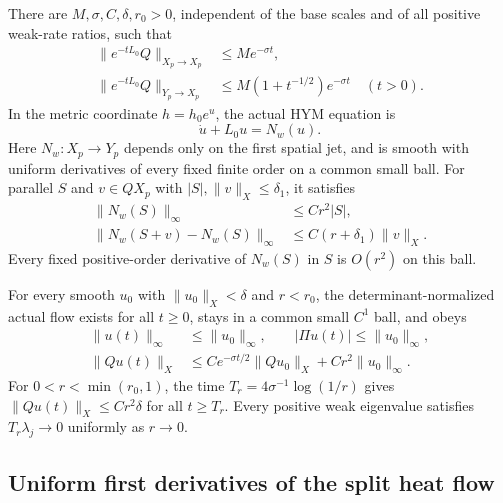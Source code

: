 \begin{theorem}\label{thm:spatial-entry}
There are $M,\sigma,C,\delta,r_0>0$, independent of the
base scales and of all positive weak-rate ratios, such that
\begin{equation}\label{eq:split-heat-smoothing}
 \begin{split}
 \|e^{-tL_0}Q\|_{X_p\to X_p}&\le Me^{-\sigma t},\\
 \|e^{-tL_0}Q\|_{Y_p\to X_p}
                    &\le M(1+t^{-1/2})e^{-\sigma t}\quad(t>0).
 \end{split}
\end{equation}
In the metric coordinate $h=h_0e^u$, the actual HYM equation is
\begin{equation}\label{eq:exact-log-flow}
                  \dot u+L_0u=N_w(u).
\end{equation}
Here $N_w:X_p\to Y_p$ depends only on the first spatial
jet, and is smooth with uniform derivatives of every fixed
finite order on a common small ball. For parallel $S$ and
$v\in QX_p$ with $|S|,\|v\|_X\le\delta_1$, it satisfies
\begin{equation}\label{eq:flow-nonlinearity-bounds}
 \begin{split}
 \|N_w(S)\|_\infty&\le Cr^2|S|,\\
 \|N_w(S+v)-N_w(S)\|_\infty&\le C(r+\delta_1)\|v\|_X.
 \end{split}
\end{equation}
Every fixed positive-order derivative of $N_w(S)$ in $S$
is $O(r^2)$ on this ball.

For every smooth $u_0$ with $\|u_0\|_X<\delta$ and
$r<r_0$, the determinant-normalized actual flow exists
for all $t\ge0$, stays in a common small $C^1$ ball, and obeys
\begin{equation}\label{eq:normal-entry}
 \begin{split}
 \|u(t)\|_\infty&\le\|u_0\|_\infty,
       \qquad |\Pi u(t)|\le\|u_0\|_\infty,\\
 \|Qu(t)\|_X&\le Ce^{-\sigma t/2}\|Qu_0\|_X
                         +Cr^2\|u_0\|_\infty.
 \end{split}
\end{equation}
For $0<r<\min(r_0,1)$, the time
$T_r=4\sigma^{-1}\log(1/r)$ gives $\|Qu(t)\|_X\le Cr^2\delta$
for all $t\ge T_r$. Every positive weak eigenvalue satisfies
$T_r\lambda_j\to0$ uniformly as $r\to0$.
\end{theorem}

\subsection{Uniform first derivatives of the split heat flow}

